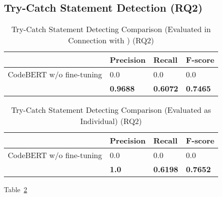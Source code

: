 \subsection{Try-Catch Statement Detection (RQ2)}
\label{sec:rq2}

\begin{table}[t]%
\caption{Try-Catch Statement Detecting Comparison (Evaluated {\xstate} in Connection with {\xblock}) (RQ2)}
  \vspace{-12pt}
  \small
	\begin{center}
		\renewcommand{\arraystretch}{1}
		\begin{tabular}{| p{3.05cm}<{\centering} | p{1.2cm}<{\centering} | p{1.2cm}<{\centering}| p{1.2cm}<{\centering}|}
		  \hline
			  & Precision  & Recall & F-score \\
			\hline
			CodeBERT w/o fine-tuning &  0.0 & 0.0  & 0.0\\
			\hline
			\tool   & \textbf{0.9688}  &  \textbf{0.6072} & \textbf{0.7465}\\
			\hline
		\end{tabular}
		\label{tab:xstate}
	\end{center}
\end{table}

\begin{table}[t]%
\caption{Try-Catch Statement Detecting Comparison (Evaluated {\xstate} as Individual) (RQ2)}
  \vspace{-12pt}
  \small
	\begin{center}
		\renewcommand{\arraystretch}{1}
		\begin{tabular}{| p{3.05cm}<{\centering} | p{1.2cm}<{\centering} | p{1.2cm}<{\centering}| p{1.2cm}<{\centering}|}
		  \hline
			  & Precision  & Recall & F-score \\
			\hline
			CodeBERT w/o fine-tuning &  0.0 & 0.0  & 0.0\\
			\hline
			\tool   & \textbf{1.0}  &  \textbf{0.6198} & \textbf{0.7652}\\
			\hline
		\end{tabular}
		\label{tab:xstate}
	\end{center}
\end{table}

Table~\ref{tab:xstate} 

